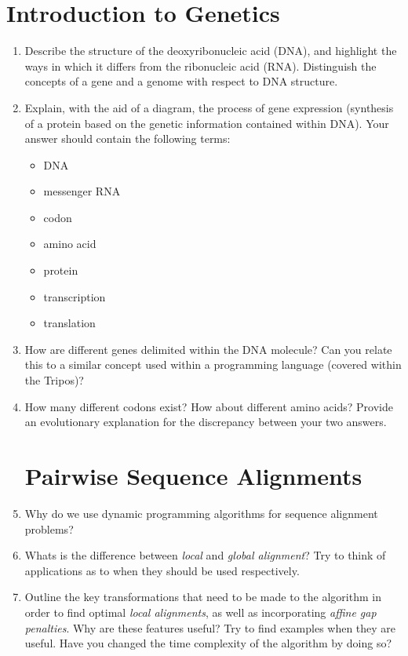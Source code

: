 \documentclass[11pt,runningheads,a4paper]{article}
\begin{document}
\section*{ Introduction to Genetics }
\begin{enumerate}
  \item Describe the structure of the deoxyribonucleic acid (DNA), and highlight the ways in which it differs from the ribonucleic acid (RNA). 
    Distinguish the concepts of a gene and a genome with respect to DNA structure.
\item Explain, with the aid of a diagram, the process of gene expression (synthesis of a protein based on the genetic information contained within DNA).
Your answer should contain the following terms:
\begin{itemize}
\item DNA
\item messenger RNA
\item codon
\item amino acid
\item protein
\item transcription
\item translation
\end{itemize}
\item How are different genes delimited within the DNA molecule? Can you relate this to a similar concept used within a programming language (covered within the Tripos)?
\item How many different codons exist? How about different amino acids? Provide an evolutionary explanation for the discrepancy between your two answers.

\section*{Pairwise Sequence Alignments}
	\item Why do we use dynamic programming algorithms for sequence alignment problems?

	\item Whats is the difference between \textit{local} and \textit{global alignment}? Try to think of applications as to when they should be used respectively.

  \item Outline the key transformations that need to be made to the algorithm in order to find optimal \textit{local alignments}, as well as incorporating \textit{affine gap penalties}. Why are these features useful? Try to find examples when they are useful. Have you changed the time complexity of the algorithm by doing so?


\end{enumerate}
\end{document}
